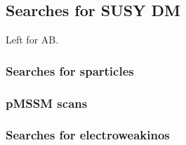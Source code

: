 

 




\subsection{Searches for SUSY DM}
\label{sec:results_SUSYSearches}

Left for AB. 

\subsubsection{Searches for sparticles}

\subsubsection{pMSSM scans}


\subsubsection{Searches for electroweakinos}



